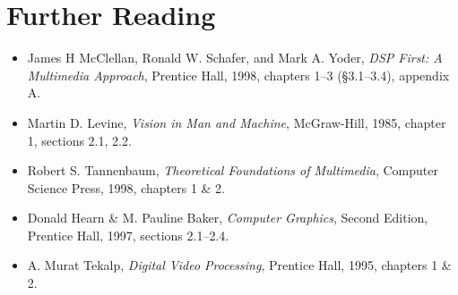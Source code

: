 \section{Further Reading}

\begin{itemize}
\item James H McClellan, Ronald W. Schafer, and Mark A. Yoder,
  \textit{DSP First: A Multimedia Approach}, Prentice Hall, 1998,
  chapters 1--3 (\S 3.1--3.4), appendix A.
\item Martin D. Levine, \textit{Vision in Man and Machine},
  McGraw-Hill, 1985, chapter 1, sections 2.1, 2.2.
\item Robert S. Tannenbaum, \textit{Theoretical Foundations of
  Multimedia}, Computer Science Press, 1998, chapters 1 \& 2.
\item Donald Hearn \& M. Pauline Baker, \textit{Computer Graphics},
  Second Edition, Prentice Hall, 1997, sections 2.1--2.4.
\item A. Murat Tekalp, \textit{Digital Video Processing}, Prentice
  Hall, 1995, chapters 1 \& 2. 
\end{itemize}

